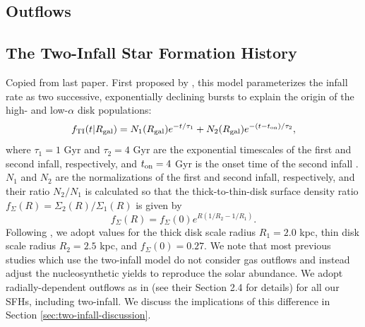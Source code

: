 \documentclass[twocolumn,twocolappendix,linenumbers]{aastex631}
\newcommand{\todo}[1]{{\color{red}#1}}
\begin{document}
\subsection{Outflows}
\label{sec:outflows}

\subsection{The Two-Infall Star Formation History}
\label{sec:sfh}

\todo{Copied from last paper.} First proposed by \citet{chiappini_chemical_1997}, this model parameterizes the infall rate as two successive, exponentially declining bursts to explain the origin of the high- and low-$\alpha$ disk populations:
\begin{equation}
    \label{eq:twoinfall-ifr}
    f_{\rm TI}(t|R_{\rm gal}) = N_1(R_{\rm gal}) e^{-t/\tau_1} + N_2(R_{\rm gal}) e^{-(t-t_{\rm on})/\tau_2},
\end{equation}
where $\tau_1=1$ Gyr and $\tau_2=4$ Gyr are the exponential timescales of the first and second infall, respectively, and $t_{\rm on}=4$ Gyr is the onset time of the second infall \citep[based on typical values in, e.g.,][]{chiappini_chemical_1997,spitoni_galactic_2020,spitoni_apogee_2021}. $N_1$ and $N_2$ are the normalizations of the first and second infall, respectively, and their ratio $N_2/N_1$ is calculated so that the thick-to-thin-disk surface density ratio $f_\Sigma(R)=\Sigma_2(R)/\Sigma_1(R)$ is given by
\begin{equation}
    f_\Sigma(R) = f_\Sigma(0) e^{R(1/R_2 - 1/R_1)}.
\end{equation}
Following \citet{bland-hawthorn_galaxy_2016}, we adopt values for the thick disk scale radius $R_1=2.0$ kpc, thin disk scale radius $R_2=2.5$ kpc, and $f_\Sigma(0)=0.27$.
We note that most previous studies which use the two-infall model \citep[e.g.][]{chiappini_chemical_1997,matteucci_new_2006,matteucci_effect_2009,spitoni_galactic_2019} do not consider gas outflows and instead adjust the nucleosynthetic yields to reproduce the solar abundance. We adopt radially-dependent outflows as in  (see their Section 2.4 for details) for all our SFHs, including two-infall. We discuss the implications of this difference in Section \ref{sec:two-infall-discussion}.
\end{document}
